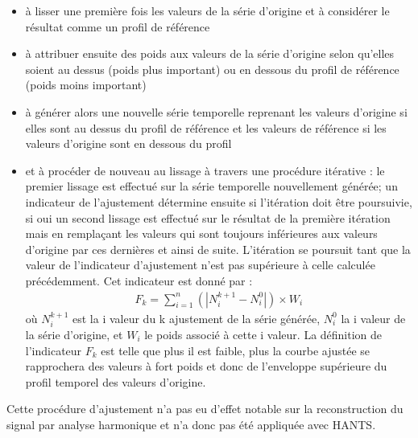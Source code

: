 \begin{itemize}
 \item à lisser une première fois les valeurs de la série d'origine et à considérer le résultat comme un profil de référence 
 \item à attribuer ensuite des poids aux valeurs de la série d'origine selon qu'elles soient au dessus (poids plus important) ou en dessous du profil de référence (poids moins important)
 \item à générer alors une nouvelle série temporelle reprenant les valeurs d'origine si elles sont au dessus du profil de référence et les valeurs de référence si les valeurs d'origine sont en dessous du profil
 \item et à procéder de nouveau au lissage à travers une procédure itérative : le premier lissage est effectué sur la série temporelle nouvellement générée; un indicateur de l'ajustement détermine ensuite si l'itération doit être poursuivie, si oui un second lissage est effectué sur le résultat de la première itération mais en remplaçant les valeurs qui sont toujours inférieures aux valeurs d'origine par ces dernières et ainsi de suite. L'itération se poursuit tant que la valeur de l'indicateur d'ajustement n'est pas supérieure à celle calculée précédemment. Cet indicateur est donné par :
 \begin{align}
   F_{k} = \sum_{i=1}^{n} (|N_{i}^{k+1} - N_{i}^{0}|) \times W_{i}
 \end{align}
 où $N_{i}^{k+1}$ est la i valeur du k ajustement de la série générée, $N_{i}^{0}$ la i valeur de la série d'origine, et $W_{i}$ le poids associé à cette i valeur. La définition de l'indicateur $F_{k}$ est telle que plus il est faible, plus la courbe ajustée se rapprochera des valeurs à fort poids et donc de l'enveloppe supérieure du profil temporel des valeurs d'origine.
\end{itemize}

\vspace{5mm}

Cette procédure d'ajustement n'a pas eu d'effet notable sur la reconstruction du signal par analyse harmonique et n'a donc pas été appliquée avec HANTS. 

